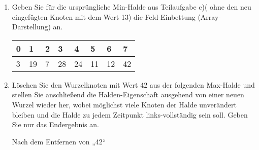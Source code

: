 \documentclass{lehramt-informatik-aufgabe}
\begin{document}
\begin{enumerate}
\begin{liDiagramm}{Nach Vertauschen von „13“ und „28“}
\end{liDiagramm}

\begin{liDiagramm}{Nach Vertauschen von „13“ und „19“}

\end{liDiagramm}


\item Geben Sie für die ursprüngliche Min-Halde aus Teilaufgabe c)(\dh
ohne den neu eingefügten Knoten mit dem Wert 13) die Feld-Einbettung
(Array-Darstellung) an.

\begin{liAntwort}
\begin{tabular}{llllllll}
\bf{0} & \bf{1} & \bf{2} & \bf{3} & \bf{4} & \bf{5} & \bf{6} & \bf{7} \\
\hline
3      & 19     & 7      & 28     & 24     & 11     & 12     & 42     \\
\end{tabular}
\end{liAntwort}


\item Löschen Sie den Wurzelknoten mit Wert 42 aus der folgenden
Max-Halde und stellen Sie anschließend die Halden-Eigenschaft ausgehend
von einer neuen Wurzel wieder her, wobei möglichst viele Knoten der
Halde unverändert bleiben und die Halde zu jedem Zeitpunkt
links-vollständig sein soll. Geben Sie nur das Endergebnis an.

\begin{center}
\end{center}

\begin{liDiagramm}{Nach dem Entfernen von „42“}
\end{liDiagramm}


\end{enumerate}
\end{document}
